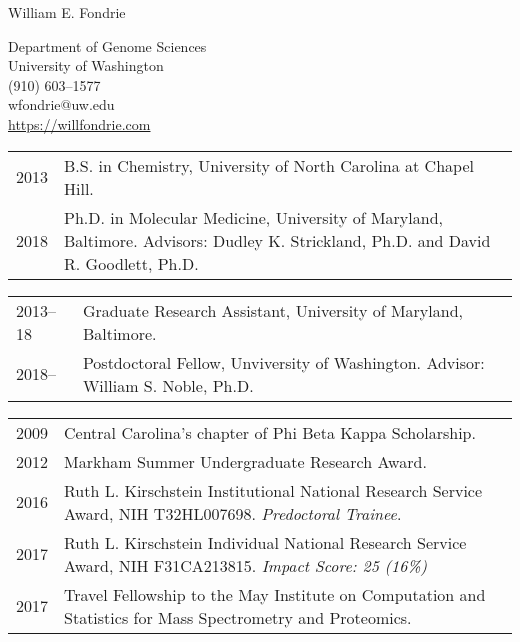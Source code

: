 \documentclass{article}
\newcommand{\mysection}[1]{\vspace{1ex}{\bf #1}}
\begin{document}
\begin{center}
  {\Large William E. Fondrie}

  Department of Genome Sciences\\
  University of Washington\\
  (910) 603--1577\\
  wfondrie@uw.edu \\
  \url{https://willfondrie.com}
\end{center}

\mysection{Education}

\begin{tabular}{p{0.5in}p{5.75in}}
  2013 & B.S. in Chemistry, University of North Carolina at Chapel Hill.\\
  2018 & Ph.D. in Molecular Medicine, University of Maryland, Baltimore. \newline Advisors: Dudley K. Strickland, Ph.D. and David R. Goodlett, Ph.D.\\
\end{tabular}

\mysection{Employment and Professional Appointments}

\begin{tabular}{p{0.5in}p{5.75in}}
  2013--18 & Graduate Research Assistant, University of Maryland, Baltimore.\\
  2018--     & Postdoctoral Fellow, Unviversity of Washington. \newline Advisor: William S. Noble, Ph.D.\\
\end{tabular}

\mysection{Awards}

\begin{tabular}{p{0.5in}p{5.75in}}
  2009 & Central Carolina's chapter of Phi Beta Kappa Scholarship.\\
  2012 & Markham Summer Undergraduate Research Award.\\
  2016 & Ruth L. Kirschstein Institutional National Research Service Award, NIH T32HL007698. \newline \textit{Predoctoral Trainee}.\\
  2017 & Ruth L. Kirschstein Individual National Research Service Award, NIH F31CA213815. \newline \textit{Impact Score: 25 (16\%)}\\
  2017 & Travel Fellowship to the May Institute on Computation and Statistics for Mass Spectrometry and Proteomics.\\
\end{tabular}
\end{document}
